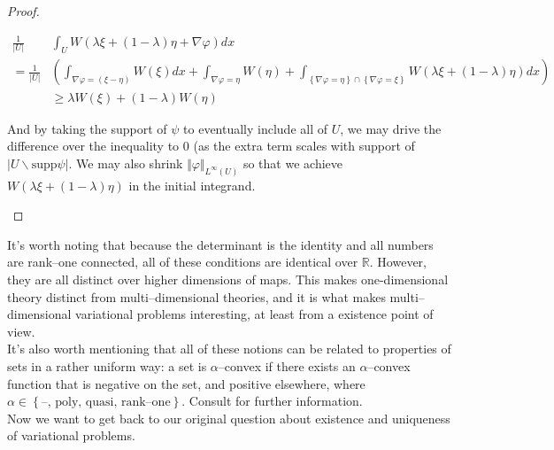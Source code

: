 \documentclass[../main.tex]{subfiles}
\begin{document}
\begin{proof}
\begin{itemize}
			\begin{align*}
				\frac{1}{\left| U \right|} & \int_U W \left( \lambda \xi + (1- \lambda) \eta + \nabla \varphi \right) dx \\ = \frac{1}{\left| U \right|} & \left( \int_{\nabla \varphi = (\xi - \eta)} W(\xi) dx + \int_{\nabla \varphi = \eta} W(\eta) + \int_{\left\{ \nabla \varphi = \eta \right\} \cap \left\{ \nabla \varphi = \xi \right\}} W( \lambda \xi + (1- \lambda) \eta) dx  \right) \\
				                           & \geq \lambda W(\xi) + (1- \lambda) W(\eta)
			\end{align*}

			And by taking the support of $\psi$ to eventually include all of $U$, we may drive the difference over the inequality to 0 (as the extra term scales with support of $\left| U \backslash \mathrm{supp} \psi \right|$.
			We may also shrink $\Vert \varphi \Vert_{L^{\infty}(U)}$ so that we achieve $W(\lambda \xi + (1- \lambda) \eta)$ in the initial integrand.
	\end{itemize}

\end{proof}

It's worth noting that because the determinant is the identity and all numbers are rank--one connected, all of these conditions are identical over $\mathbb{R}$.
However, they are all distinct over higher dimensions of maps.
This makes one-dimensional theory distinct from multi--dimensional theories, and it is what makes multi--dimensional variational problems interesting, at least from a existence point of view. \\

It's also worth mentioning that all of these notions can be related to properties of sets in a rather uniform way: a set is $\alpha$--convex if there exists an $\alpha$--convex function that is negative on the set, and positive elsewhere, where $\alpha \in \left\{ \text{--, poly, quasi, rank--one} \right\}$.
Consult \cite{dacorogna_direct_2008} for further information. \\

Now we want to get back to our original question about existence and uniqueness of variational problems.



\printbibliography
\end{document}
